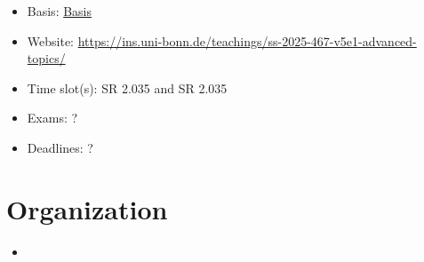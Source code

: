 \begin{tcolorbox}[enhanced,breakable,
	title=General Information,frame style={color=mycolor}]
    \begin{itemize}
        \item Basis: \href{https://basis.uni-bonn.de/qisserver/rds?state=verpublish&status=init&vmfile=no&publishid=261270&moduleCall=webInfo&publishConfFile=webInfo&publishSubDir=veranstaltung}{Basis}
        \item Website: \href{https://ins.uni-bonn.de/teachings/ss-2025-467-v5e1-advanced-topics/}{https://ins.uni-bonn.de/teachings/ss-2025-467-v5e1-advanced-topics/}
        \item Time slot(s):  SR 2.035 and  SR 2.035
        \item Exams: ?
        \item Deadlines: ?
    \end{itemize}
\end{tcolorbox}

\section{Organization}

\begin{itemize}
    \item 
\end{itemize}
 


